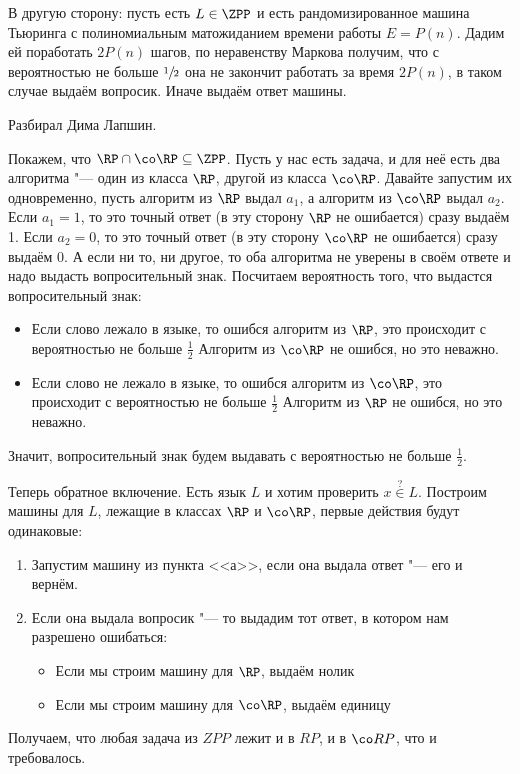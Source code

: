 	В другую сторону: пусть есть $L \in \ZPP$ и есть рандомизированное машина Тьюринга
	с полиномиальным матожиданием времени работы $E=P(n)$.
	Дадим ей поработать $2P(n)$ шагов, по неравенству Маркова получим, что с вероятностью не больше $\sfrac 12$
	она не закончит работать за время $2P(n)$, в таком случае выдаём вопросик.
	Иначе выдаём ответ машины.

	Разбирал Дима Лапшин.

	Покажем, что $\RP \cap \co\RP \subseteq \ZPP$.
	Пусть у нас есть задача, и для неё есть два алгоритма "--- один из класса $\RP$, другой из класса $\co\RP$.
	Давайте запустим их одновременно, пусть алгоритм из $\RP$ выдал $a_1$, а алгоритм из $\co\RP$ выдал $a_2$.
	Если $a_1=1$, то это точный ответ (в эту сторону $\RP$ не ошибается) сразу выдаём 1.
	Если $a_2=0$, то это точный ответ (в эту сторону $\co\RP$ не ошибается) сразу выдаём 0.
	А если ни то, ни другое, то оба алгоритма не уверены в своём ответе и надо выдасть вопросительный знак.
	Посчитаем вероятность того, что выдастся вопросительный знак:
	\begin{itemize}
		\item
			Если слово лежало в языке, то ошибся алгоритм из $\RP$, это происходит с вероятностью не больше $\frac 12$
			Алгоритм из $\co\RP$ не ошибся, но это неважно.
		\item
			Если слово не лежало в языке, то ошибся алгоритм из $\co\RP$, это происходит с вероятностью не больше $\frac 12$
			Алгоритм из $\RP$ не ошибся, но это неважно.
	\end{itemize}
	Значит, вопросительный знак будем выдавать с вероятностью не больше $\frac 1 2$.

	Теперь обратное включение.
	Есть язык $L$ и хотим проверить $x \stackrel{?}{\in} L$.
	Построим машины для $L$, лежащие в классах $\RP$ и $\co\RP$, первые действия будут одинаковые:
	\begin{enumerate}
		\item Запустим машину из пункта <<а>>, если она выдала ответ "--- его и вернём.
		\item Если она выдала вопросик "--- то выдадим тот ответ, в котором нам разрешено ошибаться:
			\begin{itemize}
				\item
					Если мы строим машину для $\RP$, выдаём нолик
				\item
					Если мы строим машину для $\co\RP$, выдаём единицу
			\end{itemize}
	\end{enumerate}
	Получаем, что любая задача из $ZPP$ лежит и в $RP$, и в $\co RP$, что и требовалось.

